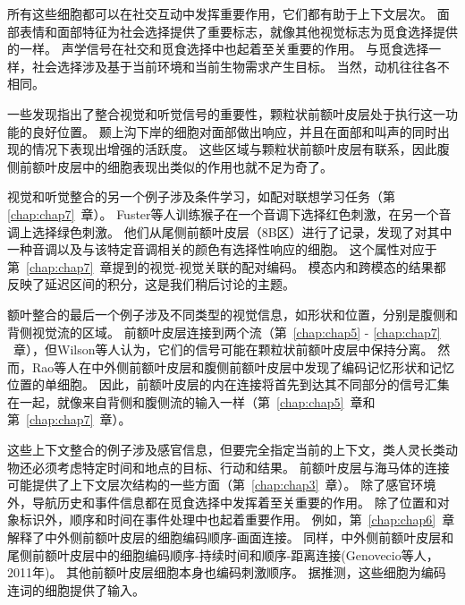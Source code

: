 所有这些细胞都可以在社交互动中发挥重要作用，它们都有助于上下文层次。
面部表情和面部特征为社会选择提供了重要标志，就像其他视觉标志为觅食选择提供的一样。
声学信号在社交和觅食选择中也起着至关重要的作用。
与觅食选择一样，社会选择涉及基于当前环境和当前生物需求产生目标。
当然，动机往往各不相同。
\par


一些发现指出了整合视觉和听觉信号的重要性，颗粒状前额叶皮层处于执行这一功能的良好位置。
颞上沟下岸的细胞对面部做出响应，并且在面部和叫声的同时出现的情况下表现出增强的活跃度\cite{barraclough2005integration}。
这些区域与颗粒状前额叶皮层有联系，因此腹侧前额叶皮层中的细胞表现出类似的作用也就不足为奇了\cite{sugihara2006integration}。
\par


视觉和听觉整合的另一个例子涉及条件学习，如配对联想学习任务（第~ \ref{chap:chap7}~章）。
Fuster等人\cite{fuster2000executive}训练猴子在一个音调下选择红色刺激，在另一个音调上选择绿色刺激。
他们从尾侧前额叶皮层（8B区）进行了记录，发现了对其中一种音调以及与该特定音调相关的颜色有选择性响应的细胞。
这个属性对应于第~\ref{chap:chap7}~章提到的视觉-视觉关联的配对编码。
模态内和跨模态的结果都反映了延迟区间的积分，这是我们稍后讨论的主题。
\par


额叶整合的最后一个例子涉及不同类型的视觉信息，如形状和位置，分别是腹侧和背侧视觉流的区域。
前额叶皮层连接到两个流（第~\ref{chap:chap5} - \ref{chap:chap7} ~章），但Wilson等人\cite{wilson1993dissociation}认为，它们的信号可能在颗粒状前额叶皮层中保持分离。
然而，Rao等人\cite{rao1997integration}在中外侧前额叶皮层和腹侧前额叶皮层中发现了编码记忆形状和记忆位置的单细胞。
因此，前额叶皮层的内在连接将首先到达其不同部分的信号汇集在一起，就像来自背侧和腹侧流的输入一样（第~\ref{chap:chap5}~章和第~\ref{chap:chap7}~章）。
\par

这些上下文整合的例子涉及感官信息，但要完全指定当前的上下文，类人灵长类动物还必须考虑特定时间和地点的目标、行动和结果。
前额叶皮层与海马体的连接可能提供了上下文层次结构的一些方面（第~\ref{chap:chap3}~章）。
除了感官环境外，导航历史和事件信息都在觅食选择中发挥着至关重要的作用。
除了位置和对象标识外，顺序和时间在事件处理中也起着重要作用。
例如，第~\ref{chap:chap6}~章解释了中外侧前额叶皮层的细胞编码顺序-画面连接\cite{warden2007representation}。
同样，中外侧前额叶皮层和尾侧前额叶皮层中的细胞编码顺序-持续时间\cite{tsujimoto2009monkey}和顺序-距离连接(Genovecio等人，2011年)。
其他前额叶皮层细胞本身也编码刺激顺序\cite{ninokura2003representation,ninokura2004integration}。
据推测，这些细胞为编码连词的细胞提供了输入。
\par


